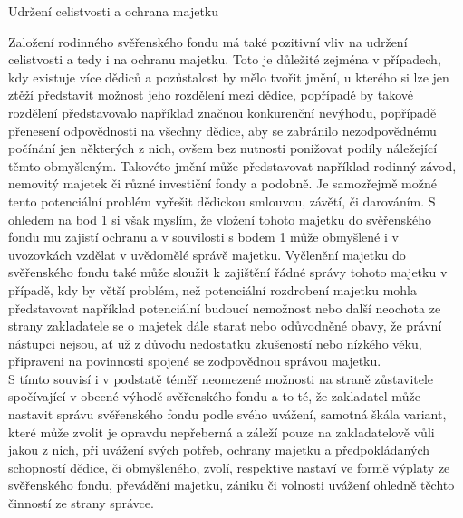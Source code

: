 \documentclass{article}
\begin{document}
 
 \newpage
 \thispagestyle{smallertextinheader}
 
  \begin{enumerate}
 {\Large\item[4.] Udržení celistvosti a ochrana majetku}
 \end{enumerate}
 
 Založení rodinného svěřenského fondu má také pozitivní vliv na udržení celistvosti a tedy i na ochranu majetku. Toto je důležité zejména v případech, kdy existuje více dědiců a pozůstalost by mělo tvořit jmění, u kterého si lze jen ztěží představit možnost jeho rozdělení mezi dědice, popřípadě by takové rozdělení představovalo například značnou konkurenční nevýhodu, popřípadě přenesení odpovědnosti na všechny dědice, aby se zabránilo nezodpovědnému počínání jen některých z nich, ovšem bez nutnosti ponižovat podíly náležející těmto obmyšleným. Takovéto jmění může představovat například rodinný závod, nemovitý majetek či různé investiční fondy a podobně. Je samozřejmě možné tento potenciální problém vyřešit dědickou smlouvou, závětí, či darováním. S ohledem na bod 1 si však myslím, že vložení tohoto majetku do svěřenského fondu mu zajistí ochranu a v souvilosti s bodem 1 může obmyšlené i v uvozovkách vzdělat v uvědomělé správě majetku. Vyčlenění majetku do svěřenského fondu také může sloužit k zajištění řádné správy tohoto majetku v případě, kdy by větší problém, než potenciální rozdrobení majetku mohla představovat například potenciální budoucí nemožnost nebo další neochota ze strany zakladatele se o majetek dále starat nebo odůvodněné obavy, že právní nástupci nejsou, ať už z důvodu nedostatku zkušeností nebo nízkého věku, připraveni na povinnosti spojené se zodpovědnou správou majetku.\\
 
S tímto souvisí i v podstatě téměř neomezené možnosti na straně zůstavitele spočívající v obecné výhodě svěřenského fondu a to té, že zakladatel může nastavit správu svěřenského fondu podle svého uvážení, samotná škála variant, které může zvolit je opravdu nepřeberná a záleží pouze na zakladatelově vůli jakou z nich, při uvážení svých potřeb, ochrany majetku a předpokládaných schopností dědice, či obmyšleného, zvolí, respektive nastaví ve formě výplaty ze svěřenského fondu, převádění majetku, zániku či volnosti uvážení ohledně těchto činností ze strany správce.\\
\end{document}
